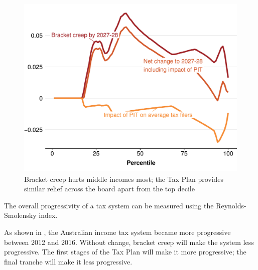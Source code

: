 \documentclass[submission]{grattan}\usepackage[]{graphicx}\usepackage[]{color}
\newenvironment{knitrout}{}{} %
\begin{document}
\begin{figure}
\caption{Bracket creep hurts middle incomes most; the Tax Plan provides similar relief across the board apart from the top decile }\label{fig:3}
\begin{knitrout}
\color{fgcolor}
\includegraphics[width=4.47222in,height=3.51158068592058in]{atlas/fig3-1} 

\end{knitrout}
\end{figure}

The overall progressivity of a tax system can be measured using the Reynolds-Smolensky index.

As shown in , the Australian income tax system became more progressive between 2012 and 2016. Without change, bracket creep will make the system less progressive. The first stages of the Tax Plan will make it more progressive; the final tranche will make it less progressive.
\end{document}
